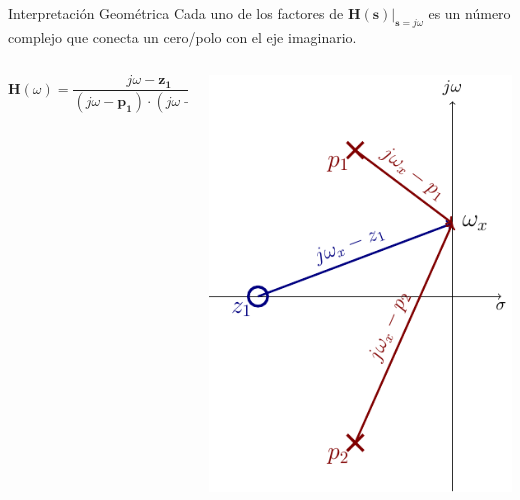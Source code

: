 \documentclass[xcolor={usenames,svgnames,dvipsnames}]{beamer}
\newcommand{\laplace}[1]{\mathbf{#1}(\mathbf{s})}
\newcommand{\slp}{\mathbf{s}}
\newcommand{\fasor}[1]{\mathbf{#1}(\omega)}
\begin{document}
\begin{frame}[label={sec:org8457596}]{Interpretación Geométrica}
Cada uno de los factores de \(\laplace{H}\rvert_{\slp = j\omega}\) es un número complejo que conecta un cero/polo con el eje imaginario.
\begin{columns}
\begin{column}[t]{0.3\columnwidth}
\[
\fasor{H} = \frac{j\omega - \mathbf{z_1}}{(j\omega - \mathbf{p_1}) \cdot (j\omega - \mathbf{p_2})}
\]
\end{column}
\begin{column}[t]{0.7\columnwidth}
\begin{center}
\includegraphics[height=0.8\textheight]{figs/InterpretacionGeometrica.pdf}
\end{center}
\end{column}
\end{columns}
\end{frame}
\end{document}
